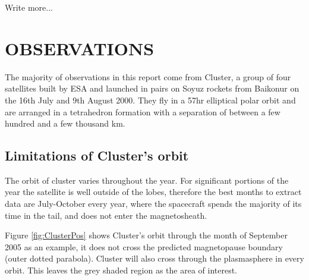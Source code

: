 \documentclass{article}
\begin{document}
Write more...


\section{OBSERVATIONS}
The majority of observations in this report come from Cluster, a group of four satellites built by ESA and launched in pairs on Soyuz rockets from Baikonur on the 16th July and 9th August 2000. They fly in a 57hr elliptical polar orbit and are arranged in a tetrahedron formation with a separation of between a few hundred and a few thousand km.

\subsection{Limitations of Cluster's orbit}
The orbit of cluster varies throughout the year. For significant portions of the year the satellite is well outside of the lobes, therefore the best months to extract data are July-October every year, where the spacecraft spends the majority of its time in the tail, and does not enter the magnetosheath. 

Figure \ref{fig:ClusterPos} shows Cluster's orbit through the month of September 2005 as an example, it does not cross the predicted magnetopause boundary (outer dotted parabola). Cluster will also cross through the plasmasphere in every orbit. This leaves the grey shaded region as the area of interest.
\end{document}
